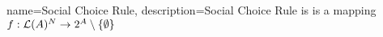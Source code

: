 {
    name=Social Choice Rule,
    description={Social Choice Rule is is a mapping $f:\mathcal{L}(A)^{N}\rightarrow 2^{A} \setminus \{\emptyset \}$}
}
